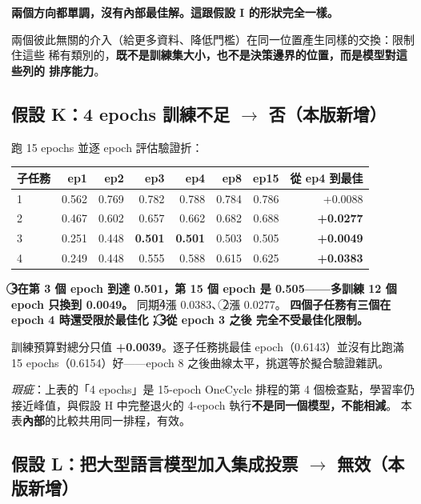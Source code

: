 \documentclass[11pt,a4paper]{ctexart}
\begin{document}
\textbf{兩個方向都單調，沒有內部最佳解。這跟假設 I 的形狀完全一樣。}

\begin{tcolorbox}[colback=blue!5, colframe=blue!55]
兩個彼此無關的介入（給更多資料、降低門檻）在同一位置產生同樣的交換：限制住這些
稀有類別的，\textbf{既不是訓練集大小，也不是決策邊界的位置，而是模型對這些列的
排序能力}。
\end{tcolorbox}

\subsection*{假設 K：4 epochs 訓練不足 $\to$ 否（本版新增）}

跑 15 epochs 並逐 epoch 評估驗證折：

\begin{table}[h]
\centering\small
\begin{tabular}{@{}lrrrrrrr@{}}
\toprule
子任務 & ep1 & ep2 & \textbf{ep3} & ep4 & ep8 & ep15 & 從 ep4 到最佳 \\
\midrule
\textcircled{1} & 0.562 & 0.769 & 0.782 & 0.788 & 0.784 & 0.786 & +0.0088 \\
\textcircled{2} & 0.467 & 0.602 & 0.657 & 0.662 & 0.682 & 0.688 & \textbf{+0.0277} \\
\rowcolor{yellow!15}
\textcircled{3} & 0.251 & 0.448 & \textbf{0.501} & \textbf{0.501} & 0.503 & 0.505 & \textbf{+0.0049} \\
\textcircled{4} & 0.249 & 0.448 & 0.555 & 0.588 & 0.615 & 0.625 & \textbf{+0.0383} \\
\bottomrule
\end{tabular}
\end{table}

\textbf{\textcircled{3}在第 3 個 epoch 到達 0.501，第 15 個 epoch 是 0.505——多訓練
12 個 epoch 只換到 0.0049。} 同期\textcircled{4}漲 0.0383、\textcircled{2}漲 0.0277。
\textbf{四個子任務有三個在 epoch 4 時還受限於最佳化；\textcircled{3}從 epoch 3 之後
完全不受最佳化限制。}

訓練預算對總分只值 \textbf{+0.0039}。逐子任務挑最佳 epoch（0.6143）並沒有比跑滿
15 epochs（0.6154）好——epoch 8 之後曲線太平，挑選等於擬合驗證雜訊。

\textit{瑕疵}：上表的「4 epochs」是 15-epoch OneCycle 排程的第 4 個檢查點，學習率仍
接近峰值，與假設 H 中完整退火的 4-epoch 執行\textbf{不是同一個模型，不能相減}。
本表\textbf{內部}的比較共用同一排程，有效。

\subsection*{假設 L：把大型語言模型加入集成投票 $\to$ 無效（本版新增）}
\end{document}
